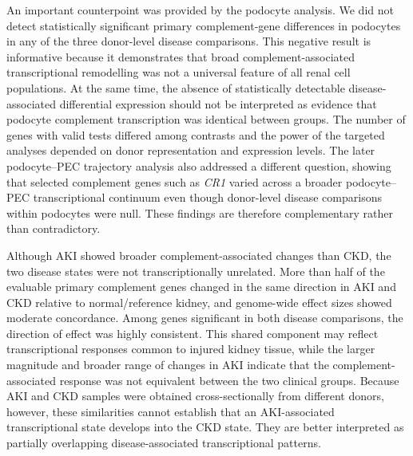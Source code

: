 \documentclass[10pt,letterpaper]{article}
\begin{document}
An important counterpoint was provided by the podocyte analysis. We did not detect statistically significant primary complement-gene differences in podocytes in any of the three donor-level disease comparisons. This negative result is informative because it demonstrates that broad complement-associated transcriptional remodelling was not a universal feature of all renal cell populations. At the same time, the absence of statistically detectable disease-associated differential expression should not be interpreted as evidence that podocyte complement transcription was identical between groups. The number of genes with valid tests differed among contrasts and the power of the targeted analyses depended on donor representation and expression levels. The later podocyte--PEC trajectory analysis also addressed a different question, showing that selected complement genes such as \textit{CR1} varied across a broader podocyte--PEC transcriptional continuum even though donor-level disease comparisons within podocytes were null. These findings are therefore complementary rather than contradictory.

Although AKI showed broader complement-associated changes than CKD, the two disease states were not transcriptionally unrelated. More than half of the evaluable primary complement genes changed in the same direction in AKI and CKD relative to normal/reference kidney, and genome-wide effect sizes showed moderate concordance. Among genes significant in both disease comparisons, the direction of effect was highly consistent. This shared component may reflect transcriptional responses common to injured kidney tissue, while the larger magnitude and broader range of changes in AKI indicate that the complement-associated response was not equivalent between the two clinical groups. Because AKI and CKD samples were obtained cross-sectionally from different donors, however, these similarities cannot establish that an AKI-associated transcriptional state develops into the CKD state. They are better interpreted as partially overlapping disease-associated transcriptional patterns.
\end{document}
